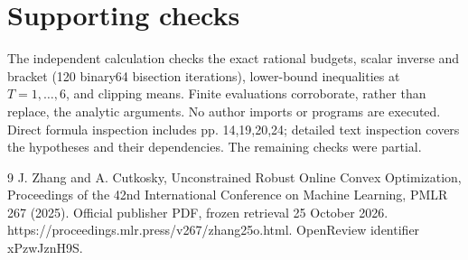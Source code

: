 \documentclass[10pt]{article}
\begin{document}
\section*{Supporting checks}
The independent calculation checks the exact rational budgets, scalar inverse and bracket (120 binary64 bisection iterations), lower-bound inequalities at \(T=1,\ldots,6\), and clipping means. Finite evaluations corroborate, rather than replace, the analytic arguments. No author imports or programs are executed. Direct formula inspection includes pp. 14,19,20,24; detailed text inspection covers the hypotheses and their dependencies. The remaining checks were partial.\par
9 J. Zhang and A. Cutkosky, Unconstrained Robust Online Convex Optimization, Proceedings of the 42nd International Conference on Machine Learning, PMLR 267 (2025). Official publisher PDF, frozen retrieval 25 October 2026. https://proceedings.mlr.press/v267/zhang25o.html. OpenReview identifier xPzwJznH9S.\par
\end{document}
